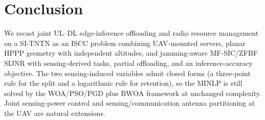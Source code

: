 \documentclass[journal]{IEEEtran}
\begin{document}
\section{Conclusion}
We recast joint UL--DL edge-inference offloading and radio resource management on a SI-TNTN as an ISCC problem combining UAV-mounted servers, planar HPPP geometry with independent altitudes, and jamming-aware MF-SIC/ZFBF SIJNR with sensing-derived tasks, partial offloading, and an inference-accuracy objective. The two sensing-induced variables admit closed forms (a three-point rule for the split and a logarithmic rule for retention), so the MINLP is still solved by the {\color{blue}WOA/PSO/PGD} plus BWOA framework at unchanged complexity. Joint sensing-power control and sensing/communication antenna partitioning at the UAV are natural extensions.



\end{document}
